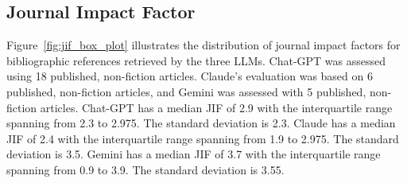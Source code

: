 \documentclass[runningheads]{llncs}
\begin{document}
\subsection{Journal Impact Factor}

Figure~\ref{fig:jif_box_plot} illustrates the distribution of journal impact factors for bibliographic references retrieved by the three LLMs.
Chat-GPT was assessed using 18 published, non-fiction articles. Claude's evaluation was based on 6 published, non-fiction articles, and Gemini was assessed with 5 published, non-fiction articles.
Chat-GPT has a median JIF of 2.9 with the interquartile range spanning from 2.3 to 2.975. The standard deviation is 2.3.
Claude has a median JIF of 2.4 with the interquartile range spanning from 1.9 to 2.975. The standard deviation is 3.5.
Gemini has a median JIF of 3.7 with the interquartile range spanning from 0.9 to 3.9. The standard deviation is 3.55.
\end{document}
